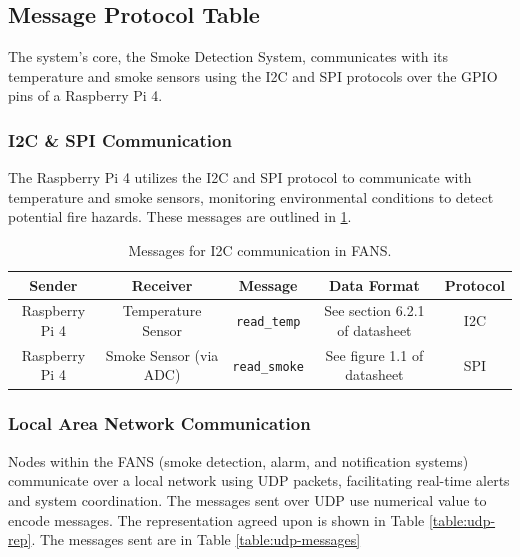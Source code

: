 \subsection{Message Protocol Table}

The system’s core, the Smoke Detection System, communicates with its temperature and smoke sensors using the I2C and
SPI protocols over the GPIO pins of a Raspberry Pi 4.

\subsubsection{I2C \& SPI Communication}

The Raspberry Pi 4 utilizes the I2C and SPI protocol to communicate with temperature and smoke sensors, monitoring
environmental conditions to detect potential fire hazards. These messages are outlined in \ref{table:i2c}.

\begin{table}
    \centering
    \footnotesize
    \begin{tabular}{| c | c | c | c | c |}
        \hline
        Sender         & Receiver               & Message              & Data Format                                          & Protocol                 \\
        \hline
        Raspberry Pi 4 & Temperature Sensor     & \texttt{read\_temp}  & See section 6.2.1 of datasheet \cite{temp-datasheet} & I2C                      \\
        \hline
        Raspberry Pi 4 & Smoke Sensor (via ADC) & \texttt{read\_smoke} & See figure 1.1 of datasheet \cite{adc-datasheet}     & SPI \cite{adc-datasheet} \\
        \hline
    \end{tabular}
    \caption{Messages for I2C communication in FANS.}
    \label{table:i2c}
\end{table}

\subsubsection{Local Area Network Communication}

Nodes within the FANS (smoke detection, alarm, and notification systems) communicate over a local network using UDP
packets, facilitating real-time alerts and system coordination. The messages sent over UDP use numerical value to
encode messages. The representation agreed upon is shown in Table \ref{table:udp-rep}. The messages sent are in Table
\ref{table:udp-messages}

